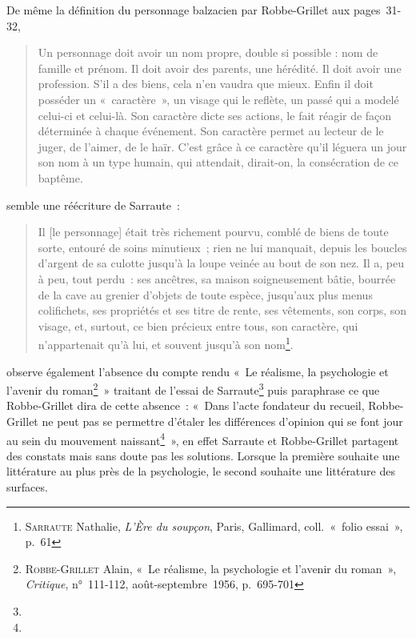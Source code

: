 De même la définition du personnage balzacien par Robbe-Grillet aux pages~31-32,
\begin{quote}
    Un personnage doit avoir un nom propre, double si possible : nom de famille et prénom. Il doit avoir des parents, une hérédité. Il doit avoir une profession. S’il a des biens, cela n’en vaudra que mieux. Enfin il doit posséder un «~caractère~», un visage qui le reflète, un passé qui a modelé celui-ci et celui-là. Son caractère dicte ses actions, le fait réagir de façon déterminée à chaque événement. Son caractère permet au lecteur de le juger, de l’aimer, de le haïr. C’est grâce à ce caractère qu’il léguera un jour son nom à un type humain, qui attendait, dirait-on, la consécration de ce baptême.
\end{quote}
semble une réécriture de Sarraute~:
\begin{quote}
    Il [le personnage] était très richement pourvu, comblé de biens de toute sorte, entouré de soins minutieux~; rien ne lui manquait, depuis les boucles d'argent de sa culotte jusqu'à la loupe veinée au bout de son nez. Il a, peu à peu, tout perdu~: ses ancêtres, sa maison soigneusement bâtie, bourrée de la cave au grenier d'objets de toute espèce, jusqu'aux plus menus colifichets, ses propriétés et ses titre de rente, ses vêtements, son corps, son visage, et, surtout, ce bien précieux entre tous, son caractère, qui n'appartenait qu'à lui, et souvent jusqu'à son nom\footnote{\textsc{Sarraute} Nathalie, \textit{L'Ère du soupçon}, Paris, Gallimard, coll.~«~folio essai~», p.~61}.  
\end{quote}

\galia{} observe également l'absence du compte rendu «~Le réalisme, la psychologie et l’avenir du roman\footnote{\textsc{Robbe-Grillet} Alain, «~Le réalisme, la psychologie et l’avenir du roman~», \textit{Critique}, n°~111-112, août-septembre~1956, p.~695-701}~» traitant de l'essai de Sarraute\footnote{} puis paraphrase ce que Robbe-Grillet dira de cette absence~: «~Dans l’acte fondateur du recueil, Robbe-Grillet ne peut pas se permettre d’étaler les différences d’opinion qui se font jour au sein du mouvement naissant\footnote{}~», en effet Sarraute et Robbe-Grillet partagent des constats mais sans doute pas les solutions. Lorsque la première souhaite une littérature au plus près de la psychologie, le second souhaite une littérature des surfaces.

